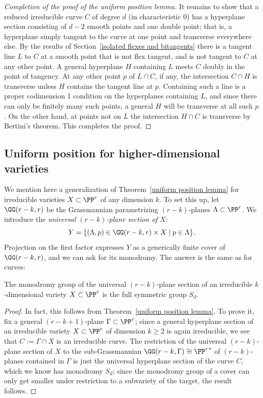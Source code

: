 \begin{proof}[Completion of the proof of the uniform position lemma]
 It remains to show that a reduced irreducible curve $C$ of degree $d$ (in characteristic 0)
 has a hyperplane section consisting of $d-2$ smooth points and one double point; that is, a hyperplane simply tangent to the curve at one point and transverse everywhere else. By the results of 
 Section~\ref{isolated flexes and bitangents} there is a tangent line $L$ to $C$ at a smooth point that is not flex tangent, and is not tangent to $C$ at any other point. A general hyperplane $H$ containing $L$ meets $C$ doubly in the point of
 tangency. At any other point $p$ of $L\cap C$, if any, the intersection $C\cap H$ is transverse
 unless $H$ contains the tangent line at $p$. Containing such a line is a  proper codimension 1 condition on
 the hyperplanes containing $L$, and since there can only be finitely many such points, a
 general  $H$ will be transverse at all such $p$. On the other hand, at points not on $L$
 the intersection $H\cap C$ is transverse by Bertini's theorem. This completes the proof.
\end{proof}

\subsection{Uniform position for higher-dimensional varieties}

We mention here a generalization of Theorem~\ref{uniform position lemma} for irreducible varieties $X \subset \PP^r$ of any dimension $k$. To set this up, let $\GG(r-k,r)$ be the Grassmannian parametrizing $(r-k)$-planes $\Lambda \subset \PP^r$. We introduce the \emph{universal $(r-k)$-plane section of} $X$:
$$
Y = \{ (\Lambda, p) \in \GG(r-k,r) \times X \mid p \in \Lambda \}.
$$
Projection on the first factor expresses $Y$ as a generically finite cover of $\GG(r-k,r)$, and we can ask for its monodromy. The answer is the same as for curves: 


\begin{theorem}\label{higher dim uniform position lemma}
The monodromy group of the universal $(r-k)$-plane section of an irreducible $k$-dimensional variety $X \subset \PP^r$ is the full symmetric group $S_d$.
\end{theorem}

\begin{proof}
In fact, this follows from Theorem~\ref{uniform position lemma}. To prove it, fix a general $(r-k+1)$-plane $\Gamma \subset \PP^r$; since a general hyperplane section of an irreducible variety $X \subset \PP^r$ of dimension $k \geq 2$ is again irreducible, we see that $C := \Gamma \cap X$ is an irreducible curve. The restriction of the universal $(r-k)$-plane section of $X$ to the sub-Grassmannian $\GG(r-k, \Gamma) \cong {\PP^r}^*$ of $(r-k)$-planes contained in $\Gamma$ is just the universal hyperplane section of the curve $C$, which we know has monodromy $S_d$; since the monodromy group of a cover can only get smaller under restriction to a subvariety of the target, the result follows.
\end{proof}

